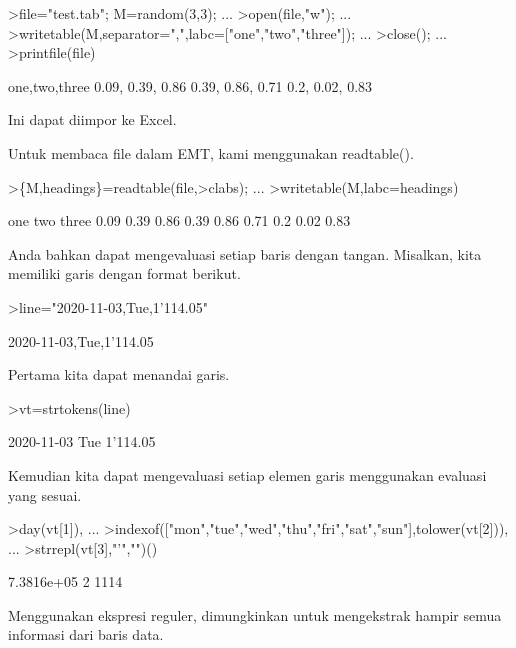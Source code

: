 \documentclass{article}
\begin{document}
\begin{eulernotebook}
\begin{eulercomment}
\begin{eulercomment}
\begin{eulercomment}
\end{eulercomment}
\begin{eulerprompt}
>file="test.tab"; M=random(3,3);  ...
>open(file,"w");  ...
>writetable(M,separator=",",labc=["one","two","three"]);  ...
>close(); ...
>printfile(file)
\end{eulerprompt}
\begin{euleroutput}
  one,two,three
        0.09,      0.39,      0.86
        0.39,      0.86,      0.71
         0.2,      0.02,      0.83
\end{euleroutput}
\begin{eulercomment}
Ini dapat diimpor ke Excel.

Untuk membaca file dalam EMT, kami menggunakan readtable().
\end{eulercomment}
\begin{eulerprompt}
>\{M,headings\}=readtable(file,>clabs); ...
>writetable(M,labc=headings)
\end{eulerprompt}
\begin{euleroutput}
         one       two     three
        0.09      0.39      0.86
        0.39      0.86      0.71
         0.2      0.02      0.83
\end{euleroutput}
\begin{eulercomment}
Anda bahkan dapat mengevaluasi setiap baris dengan tangan. Misalkan,
kita memiliki garis dengan format berikut.
\end{eulercomment}
\begin{eulerprompt}
>line="2020-11-03,Tue,1'114.05"
\end{eulerprompt}
\begin{euleroutput}
  2020-11-03,Tue,1'114.05
\end{euleroutput}
\begin{eulercomment}
Pertama kita dapat menandai garis.
\end{eulercomment}
\begin{eulerprompt}
>vt=strtokens(line)
\end{eulerprompt}
\begin{euleroutput}
  2020-11-03
  Tue
  1'114.05
\end{euleroutput}
\begin{eulercomment}
Kemudian kita dapat mengevaluasi setiap elemen garis menggunakan
evaluasi yang sesuai.
\end{eulercomment}
\begin{eulerprompt}
>day(vt[1]),  ...
>indexof(["mon","tue","wed","thu","fri","sat","sun"],tolower(vt[2])),  ...
>strrepl(vt[3],"'","")()
\end{eulerprompt}
\begin{euleroutput}
  7.3816e+05
  2
  1114
\end{euleroutput}
\begin{eulercomment}
Menggunakan ekspresi reguler, dimungkinkan untuk mengekstrak hampir
semua informasi dari baris data.


\end{eulercomment}
\end{eulercomment}
\end{eulercomment}
\end{eulernotebook}
\end{document}
